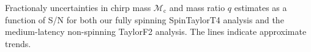 \label{fig:Mc_q_std_snr} Fractionaly uncertainties in chirp mass $\mathcal{M}_\mathrm{c}$ and mass ratio $q$ estimates as a function of S/N for both our fully spinning SpinTaylorT4 analysis and the medium-latency non-spinning TaylorF2 analysis. The lines indicate approximate trends.
  
  